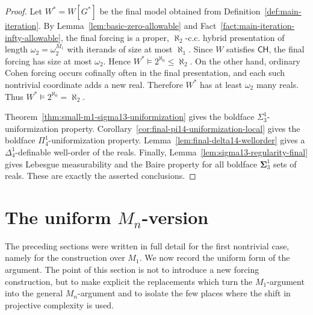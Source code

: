 \documentclass[a4paper,11pt]{article}
\newcommand{\CH}{\mathsf{CH}}
\begin{document}
\begin{proof}
Let $W^\ast=W[G^\ast]$ be the final model obtained from Definition~\ref{def:main-iteration}.  By Lemma~\ref{lem:basic-zero-allowable} and Fact~\ref{fact:main-iteration-infty-allowable}, the final forcing is a proper, $\aleph_2$-c.c. hybrid presentation of length $\omega_2=\omega_2^{M_1}$ with iterands of size at most $\aleph_1$.  Since $W$ satisfies $\CH$, the final forcing has size at most $\omega_2$.  Hence $W^\ast\models 2^{\aleph_0}\leq\aleph_2$.  On the other hand, ordinary Cohen forcing occurs cofinally often in the final presentation, and each such nontrivial coordinate adds a new real.  Therefore $W^\ast$ has at least $\omega_2$ many reals.  Thus $W^\ast\models 2^{\aleph_0}=\aleph_2$.

Theorem~\ref{thm:small-m1-sigma13-uniformization} gives the boldface $\Sigma^1_3$-uniformization property.  Corollary~\ref{cor:final-pi14-uniformization-local} gives the boldface $\Pi^1_4$-uniformization property.  Lemma~\ref{lem:final-delta14-wellorder} gives a $\Delta^1_4$-definable well-order of the reals.  Finally, Lemma~\ref{lem:sigma13-regularity-final} gives Lebesgue measurability and the Baire property for all boldface $\boldsymbol\Sigma^1_3$ sets of reals.  These are exactly the asserted conclusions.
\end{proof}



\section{The uniform $M_n$-version}\label{sec:uniform-mn-version}

The preceding sections were written in full detail for the first nontrivial case, namely for the construction over $M_1$.  We now record the uniform form of the argument.  The point of this section is not to introduce a new forcing construction, but to make explicit the replacements which turn the $M_1$-argument into the general $M_n$-argument and to isolate the few places where the shift in projective complexity is used.
\end{document}

